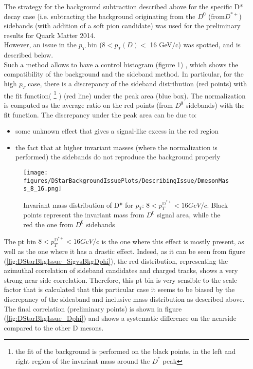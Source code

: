 The strategy for the background subtraction described above for the specific D* decay case (i.e. subtracting the background originating from the $D^{0}$ (from$ D^{*+}$) sidebands (with addition of a soft pion candidate) was used for the preliminary results for Quark Matter 2014.\ \\
However, an issue in the $p_{T}$ bin (8$<p_{T}(D)<$ 16 GeV/c) was spotted, and is described below. \ \\ 
Such a method allows to have a control histogram  (figure \ref{fig:DStarBkgIssue_mass})
, which shows the compatibility of the background and the sideband method. In particular, for the high $p_{T}$ case, there is a discrepancy of the sideband distribution (red points) with the fit function(
\footnote{the fit of the background is performed on the black points, in the left and right region of the invariant mass around the $D^{*}$ peak} )
(red line) under the peak area (blue box). The normalization is computed as the average ratio on the red points (from $D^{0}$ sidebands) with the fit function. The discrepancy under the peak area can be due to:

\begin{itemize}
\item some unknown effect that gives a signal-like excess in the red region
\item the fact that at higher invariant masses (where the normalization is performed) the sidebands do not reproduce the background properly
\end{itemize} 


\begin{figure}
\centering
{\texttt{[image: figures/DStarBackgroundIssuePlots/DescribingIssue/DmesonMass\_8\_16.png]}}
 \caption{Invariant mass distribution of D* for $p_{T}$: $8< p_{T}^{\text{D}^{*+}}< 16 GeV/c$. Black points represent the invariant mass from $D^{0}$ signal area, while the red the one from $D^{0}$ sidebands} 
\label{fig:DStarBkgIssue_mass}
\end{figure}

The pt bin $8< p_{T}^{\text{D}^{*+}}< 16 GeV/c$ is the one where this effect is mostly present, as well as the one where it has a drastic effect. Indeed, as it can be seen from figure (\ref{fig:DStarBkgIssue_SigvsBkgDphi}), the red distribution, representing the azimuthal correlation of sideband candidates and charged tracks, shows a very strong near side correlation. Therefore, this pt bin is very sensible to the scale factor that is calculated that this particular case it seems to be biased by the discrepancy of the sideaband and inclusive mass distribution as described above. The final correlation (preliminary points) is shown in figure (\ref{fig:DStarBkgIssue_Dphi}) and shows a systematic difference on the nearside compared to the other D mesons.


